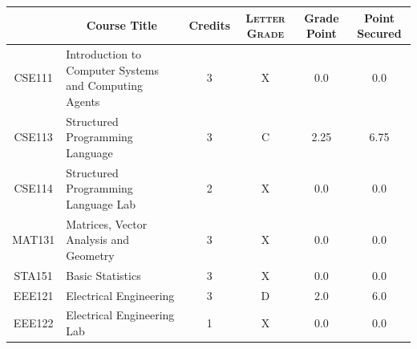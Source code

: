 \documentclass[11pt]{article}
\newcommand*{\numtwo}[1]{\pgfmathprintnumber[
                    fixed, precision=2, fixed zerofill=true]{#1}}
\begin{document}
                \begin{center}
                    \renewcommand{\arraystretch}{1.08}
                    
                \begin{tabular}{|c|l|c|>{\scshape}c|c|c|}
                \hline  \rule[-1ex]{0pt}{3.5ex} {\centering{\bf Course Code}} &  \multicolumn{1}{c|}{\textbf{Course Title}}  & {\bf Credits} & {\bf Letter Grade} & {\bf Grade Point} & {\bf Point Secured}  \\ 
                \hline   CSE111 &  Introduction to Computer Systems and Computing Agents		 & 3 & X & 0.0 & 0.0 \\ %
                \hline   CSE113 &  Structured Programming Language		 & 3 & C & 2.25 & 6.75 \\ %
                \hline   CSE114 &  Structured Programming Language Lab		 & 2 & X & 0.0 & 0.0 \\ %
                \hline   MAT131 &  Matrices, Vector Analysis and Geometry		 & 3 & X & 0.0 & 0.0 \\ %
                \hline   STA151 &  Basic Statistics		 & 3 & X & 0.0 & 0.0 \\ %
                \hline   EEE121 &  Electrical Engineering		 & 3 & D & 2.0 & 6.0 \\ %
                \hline   EEE122 &  Electrical Engineering Lab		 & 1 & X & 0.0 & 0.0 \\ %

\hline                %
                \end{tabular}
                \end{center}
                \renewcommand{\arraystretch}{1.03}
\end{document}
